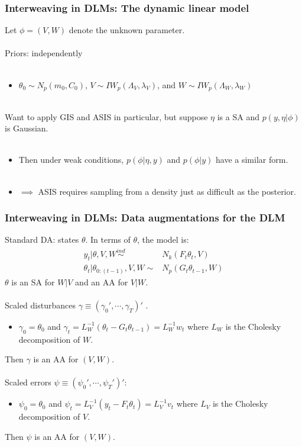 \documentclass[xcolor=dvipsnames]{beamer}
\begin{document}
\begin{frame}
  \frametitle{Interweaving in DLMs: The dynamic linear model} 
Let $\phi=(V,W)$ denote the unknown parameter.\\~\\

Priors: independently \\~\\
\begin{itemize}
\item[]$\theta_0\sim N_p(m_0,C_0)$, $V\sim IW_p(\Lambda_V,\lambda_V)$, and $W\sim IW_p(\Lambda_W,\lambda_W)$\\~\\
\end{itemize}

\pause Want to apply GIS and ASIS in particular, but suppose $\eta$ is a SA and $p(y,\eta|\phi)$ is Gaussian.\\~
\begin{itemize}
\item[] Then under weak conditions, $p(\phi|\eta,y)$ and $p(\phi|y)$ have a similar form.\\~\\
\pause\item[] $\implies$ ASIS requires sampling from a density just as difficult as the posterior.
\end{itemize}

\end{frame}

\begin{frame}
\frametitle{Interweaving in DLMs: Data augmentations for the DLM}
Standard DA: states $\theta$. In terms of $\theta$, the model is:
\begin{align*}
y_t|\theta,V,W \stackrel{ind}{\sim} & N_k(F_t\theta_t,V)\\ 
\theta_t|\theta_{0:(t-1)},V,W \sim & N_p(G_t\theta_{t-1},W)
\end{align*} 
{\color{blue}$\theta$ is an SA for $W|V$ and an AA for $V|W$.}\\~\\

\pause Scaled disturbances $\gamma\equiv(\gamma_0',\cdots,\gamma_T)'$ \citep{fruhwirth2004efficient}.
\begin{itemize}
\item[]$\gamma_0=\theta_0$ and $\gamma_t=L_W^{-1}(\theta_t - G_t\theta_{t-1})=L_W^{-1}w_t$ where $L_W$ is the Cholesky decomposition of $W$.
\end{itemize}
\pause Then {\color{blue}$\gamma$ is an AA for $(V,W)$.}\\~\\


\pause Scaled errors $\psi\equiv(\psi_0',\cdots,\psi_T')'$:
\begin{itemize}
\item[]$\psi_0=\theta_0$ and $\psi_t=L_V^{-1}(y_t - F_t\theta_t)=L_V^{-1}v_t$ where $L_V$ is the Cholesky decomposition of $V$.
\end{itemize}
\pause Then {\color{blue}$\psi$ is an AA for $(V,W)$.}
\end{frame}
\end{document}

